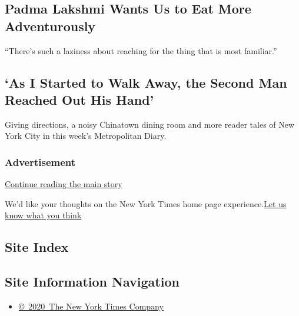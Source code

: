 \hypertarget{padma-lakshmi-wants-us-to-eat-more-adventurously}{%
\subsection{Padma Lakshmi Wants Us to Eat More
Adventurously}\label{padma-lakshmi-wants-us-to-eat-more-adventurously}}

``There's such a laziness about reaching for the thing that is most
familiar.''

\href{/interactive/2020/08/03/magazine/padma-lakshmi-interview.html}{}

\href{/2020/08/02/nyregion/metropolitan-diary.html}{}

\hypertarget{as-i-started-to-walk-away-the-second-man-reached-out-his-hand}{%
\subsection{`As I Started to Walk Away, the Second Man Reached Out His
Hand'}\label{as-i-started-to-walk-away-the-second-man-reached-out-his-hand}}

Giving directions, a noisy Chinatown dining room and more reader tales
of New York City in this week's Metropolitan Diary.

\href{/2020/08/02/nyregion/metropolitan-diary.html}{}

\hypertarget{advertisement}{%
\subsubsection{Advertisement}\label{advertisement}}

\protect\hyperlink{after-dfp-ad-mid1-large}{Continue reading the main
story}

We'd like your thoughts on the New York Times home page
experience.\href{http://nyt.qualtrics.com/jfe/form/SV_eFJmKj9v0krSE0l}{Let
us know what you think}

\hypertarget{site-index}{%
\subsection{Site Index}\label{site-index}}

\hypertarget{site-information-navigation}{%
\subsection{Site Information
Navigation}\label{site-information-navigation}}

\begin{itemize}
\tightlist
\item
  \href{https://help.nytimes3xbfgragh.onion/hc/en-us/articles/115014792127-Copyright-notice}{©~2020~The
  New York Times Company}
\end{itemize}

